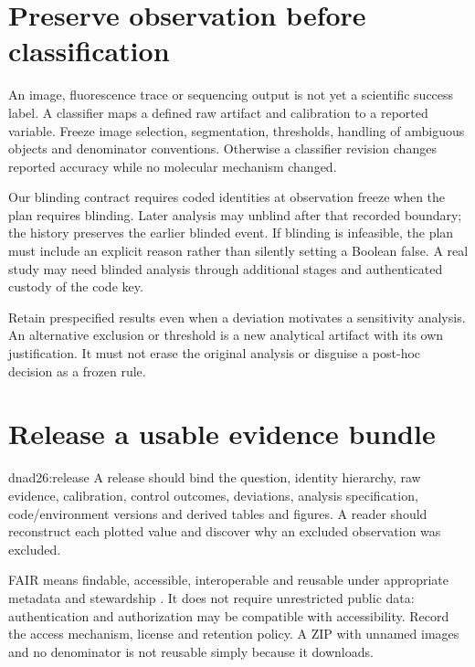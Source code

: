 \section{Preserve observation before classification}
An image, fluorescence trace or sequencing output is not yet a scientific success
label. A classifier maps a defined raw artifact and calibration to a reported
variable. Freeze image selection, segmentation, thresholds, handling of ambiguous
objects and denominator conventions. Otherwise a classifier revision changes
reported accuracy while no molecular mechanism changed.

Our blinding contract requires coded identities at observation freeze when the plan
requires blinding. Later analysis may unblind after that recorded boundary; the
history preserves the earlier blinded event. If blinding is infeasible, the plan
must include an explicit reason rather than silently setting a Boolean false.
A real study may need blinded analysis through additional stages and authenticated
custody of the code key.

Retain prespecified results even when a deviation motivates a sensitivity
analysis. An alternative exclusion or threshold is a new analytical artifact with
its own justification. It must not erase the original analysis or disguise
a post-hoc decision as a frozen rule.

\section{Release a usable evidence bundle}
{dnad26:release}
A release should bind the question, identity hierarchy, raw evidence, calibration,
control outcomes, deviations, analysis specification, code/environment versions and
derived tables and figures. A reader should reconstruct each plotted value
and discover why an excluded observation was excluded.

FAIR means findable, accessible, interoperable and reusable under appropriate
metadata and stewardship \cite{Wilkinson2016}. It does not require unrestricted
public data: authentication and authorization may be compatible with accessibility.
Record the access mechanism, license and retention policy. A ZIP with unnamed
images and no denominator is not reusable simply because it downloads.

